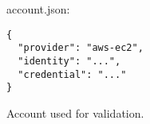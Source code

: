 \begin{figure}[tb]
  \begin{center}
    account.json:
    \begin{verbatim}
{
  "provider": "aws-ec2", 
  "identity": "...",
  "credential": "..."
}
    \end{verbatim}
  \end{center}
  \caption{Account  used for validation.}
  \label{list:validation-account}
\end{figure}

